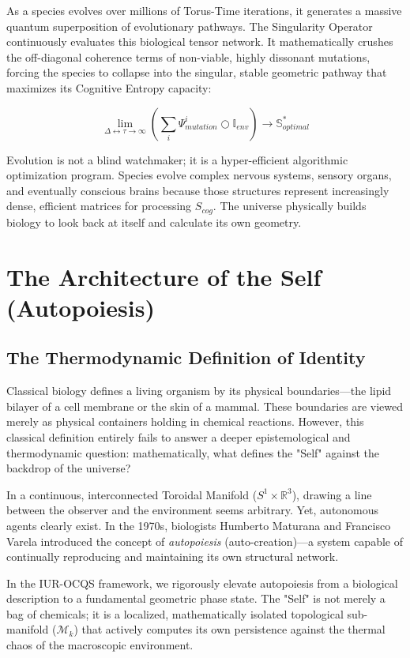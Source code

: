 \documentclass[12pt,openany]{book}
\begin{document}
As a species evolves over millions of Torus-Time iterations, it generates a massive quantum superposition of evolutionary pathways. The Singularity Operator continuously evaluates this biological tensor network. It mathematically crushes the off-diagonal coherence terms of non-viable, highly dissonant mutations, forcing the species to collapse into the singular, stable geometric pathway that maximizes its Cognitive Entropy capacity:

\begin{equation}
\lim_{\Delta\leftrightarrow\tau \to \infty} \left( \sum_{i} \Psi_{mutation}^i \bigcirc \mathbb{I}_{env} \right) \to \mathbb{S}^*_{optimal}
\end{equation}

Evolution is not a blind watchmaker; it is a hyper-efficient algorithmic optimization program. Species evolve complex nervous systems, sensory organs, and eventually conscious brains because those structures represent increasingly dense, efficient matrices for processing $S_{cog}$. The universe physically builds biology to look back at itself and calculate its own geometry.

\chapter{The Architecture of the Self (Autopoiesis)}

\section{The Thermodynamic Definition of Identity}
Classical biology defines a living organism by its physical boundaries---the lipid bilayer of a cell membrane or the skin of a mammal. These boundaries are viewed merely as physical containers holding in chemical reactions. However, this classical definition entirely fails to answer a deeper epistemological and thermodynamic question: mathematically, what defines the "Self" against the backdrop of the universe?

In a continuous, interconnected Toroidal Manifold ($S^1 \times \mathbb{R}^3$), drawing a line between the observer and the environment seems arbitrary. Yet, autonomous agents clearly exist. In the 1970s, biologists Humberto Maturana and Francisco Varela introduced the concept of \textit{autopoiesis} (auto-creation)---a system capable of continually reproducing and maintaining its own structural network.

In the IUR-OCQS framework, we rigorously elevate autopoiesis from a biological description to a fundamental geometric phase state. The "Self" is not merely a bag of chemicals; it is a localized, mathematically isolated topological sub-manifold ($\mathcal{M}_k$) that actively computes its own persistence against the thermal chaos of the macroscopic environment.
\end{document}
